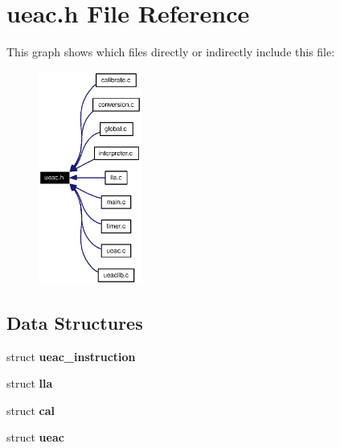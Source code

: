 \section{ueac.h File Reference}
\label{ueac_8h}


This graph shows which files directly or indirectly include this file:\begin{figure}[H]
\begin{center}
\leavevmode
\includegraphics[width=96pt]{ueac_8h__dep__incl}
\end{center}
\end{figure}
\subsection*{Data Structures}
\begin{CompactItemize}
\item 
struct {\bf ueac\_\-instruction}
\item 
struct {\bf lla}
\item 
struct {\bf cal}
\item 
struct {\bf ueac}
\end{CompactItemize}
